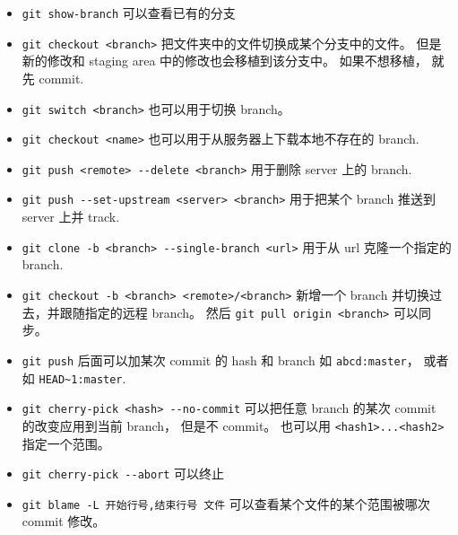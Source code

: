 \begin{itemize}
\item \verb`git show-branch` 可以查看已有的分支 
\item \verb`git checkout <branch>` 把文件夹中的文件切换成某个分支中的文件。 但是新的修改和 staging area 中的修改也会移植到该分支中。 如果不想移植， 就先 commit.
\item \verb`git switch <branch>` 也可以用于切换 branch。
\item \verb`git checkout <name>` 也可以用于从服务器上下载本地不存在的 branch.
\item \verb`git push <remote> --delete <branch>` 用于删除 server 上的 branch.
\item \verb`git push --set-upstream <server> <branch>` 用于把某个 branch 推送到 server 上并 track.
\item \verb`git clone -b <branch> --single-branch <url>` 用于从 url 克隆一个指定的 branch.
\item \verb`git checkout -b <branch> <remote>/<branch>` 新增一个 branch 并切换过去，并跟随指定的远程 branch。 然后 \verb`git pull origin <branch>` 可以同步。
\item \verb`git push` 后面可以加某次 commit 的 hash 和 branch 如 \verb`abcd:master`， 或者如 \verb`HEAD~1:master`.
\item \verb`git cherry-pick <hash> --no-commit` 可以把任意 branch 的某次 commit 的改变应用到当前 branch， 但是不 commit。 也可以用 \verb`<hash1>...<hash2>` 指定一个范围。
\item \verb`git cherry-pick --abort` 可以终止
\item \verb`git blame -L 开始行号,结束行号 文件`  可以查看某个文件的某个范围被哪次 commit 修改。
\end{itemize}

